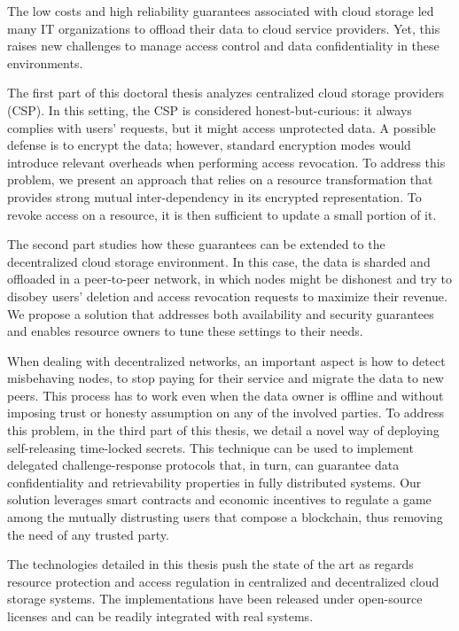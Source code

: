 The low costs and high reliability guarantees associated with cloud storage led
many IT organizations to offload their data to cloud service providers. Yet,
this raises new challenges to manage access control and data confidentiality in
these environments.

The first part of this doctoral thesis analyzes centralized cloud storage
providers (CSP). In this setting, the CSP is considered honest-but-curious: it
always complies with users' requests, but it might access unprotected data. A
possible defense is to encrypt the data; however, standard encryption modes
would introduce relevant overheads when performing access revocation. To
address this problem, we present an approach that relies on a resource
transformation that provides strong mutual inter-dependency in its encrypted
representation. To revoke access on a resource, it is then sufficient to update
a small portion of it.

The second part studies how these guarantees can be extended to the
decentralized cloud storage environment. In this case, the data is sharded and
offloaded in a peer-to-peer network, in which nodes might be dishonest and try
to disobey users' deletion and access revocation requests to maximize their
revenue. We propose a solution that addresses both availability and security
guarantees and enables resource owners to tune these settings to their needs.

When dealing with decentralized networks, an important aspect is how to detect
misbehaving nodes, to stop paying for their service and migrate the data to new
peers. This process has to work even when the data owner is offline and without
imposing trust or honesty assumption on any of the involved parties. To address
this problem, in the third part of this thesis, we detail a novel way of
deploying self-releasing time-locked secrets. This technique can be used to
implement delegated challenge-response protocols that, in turn, can guarantee
data confidentiality and retrievability properties in fully distributed systems.
Our solution leverages smart contracts and economic incentives to regulate a
game among the mutually distrusting users that compose a blockchain, thus
removing the need of any trusted party.

The technologies detailed in this thesis push the state of the art as regards
resource protection and access regulation in centralized and decentralized
cloud storage systems. The implementations have been released under
open-source licenses and can be readily integrated with real systems.
